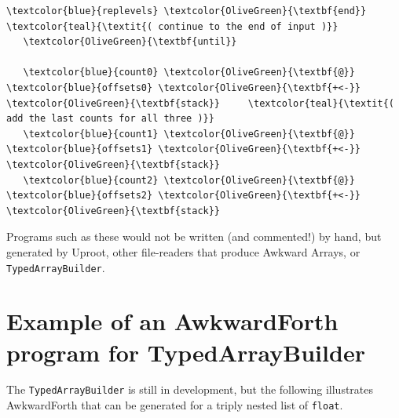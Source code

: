\documentclass{webofc}
\begin{document}
\begin{Verbatim}[commandchars=\\\{\}]
     \textcolor{blue}{replevels} \textcolor{OliveGreen}{\textbf{end}}                 \textcolor{teal}{\textit{( continue to the end of input )}}
   \textcolor{OliveGreen}{\textbf{until}}

   \textcolor{blue}{count0} \textcolor{OliveGreen}{\textbf{@}} \textcolor{blue}{offsets0} \textcolor{OliveGreen}{\textbf{+<-}} \textcolor{OliveGreen}{\textbf{stack}}     \textcolor{teal}{\textit{( add the last counts for all three )}}
   \textcolor{blue}{count1} \textcolor{OliveGreen}{\textbf{@}} \textcolor{blue}{offsets1} \textcolor{OliveGreen}{\textbf{+<-}} \textcolor{OliveGreen}{\textbf{stack}}
   \textcolor{blue}{count2} \textcolor{OliveGreen}{\textbf{@}} \textcolor{blue}{offsets2} \textcolor{OliveGreen}{\textbf{+<-}} \textcolor{OliveGreen}{\textbf{stack}}
\end{Verbatim}
\normalsize

Programs such as these would not be written (and commented!) by hand, but generated by Uproot, other file-readers that produce Awkward Arrays, or \texttt{TypedArrayBuilder}.

\section{Example of an AwkwardForth program for TypedArrayBuilder}

The \texttt{TypedArrayBuilder} is still in development, but the following illustrates AwkwardForth that can be generated for a triply nested list of \texttt{float}.
\end{document}
